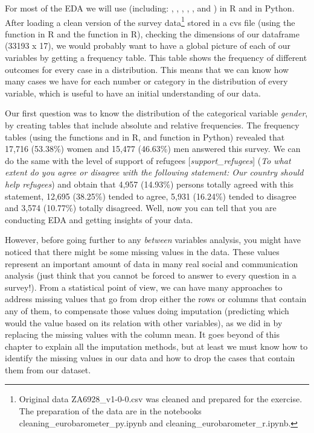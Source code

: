 For most of the EDA we will use  (including: , , , , ,  and ) in R and  in Python. After loading a clean version of the survey data\footnote{Original data ZA6928\_v1-0-0.csv was cleaned and prepared for the exercise. The preparation of the data are in the notebooks cleaning\_eurobarometer\_py.ipynb and cleaning\_eurobarometer\_r.ipynb.}  stored in a cvs file (using the  function  in R and the  function  in R), checking the dimensions of our dataframe (33193 x 17), we would probably want to have a global picture of each of our variables by getting a frequency table. This table shows the frequency of different outcomes for every case in a distribution. This means that we can know how many cases we have for each number or category in the distribution of every variable, which is useful to have an initial understanding of our data.

		
Our first question was to know the distribution of the categorical variable \textit{gender}, by creating tables that include absolute and relative frequencies. The frequency tables (using the  functions  and  in R, and  function  in Python) revealed that 17,716 (53.38\%) women and 15,477 (46.63\%) men answered this survey. We can do the same with the level of support of refugees [\textit{support\_refugees}] (\textit{To what extent do you agree or disagree with the following statement: Our country should help refugees}) and obtain that 4,957 (14.93\%) persons totally agreed with this statement, 12,695 (38.25\%) tended to agree, 5,931 (16.24\%) tended to disagree and 3,574 (10.77\%) totally disagreed. Well, now you can tell that you are conducting EDA and getting insights of your data.



However, before going further to any \textit{between} variables analysis, you might have noticed that there might be some missing values in the data. These values represent an important amount of data in many real social and communication analysis (just think that you cannot be forced to answer to every question in a survey!). From a statistical point of view, we can have many approaches to address missing values that go from drop either the rows or columns that contain any of them, to compensate those values doing imputation (predicting which would the value based on its relation with other variables), as we did in  by replacing the missing values with the column mean. It goes beyond of this chapter to explain all the imputation methods, but at least we must know how to identify the missing values in our data and how to drop the cases that contain them from our dataset.

